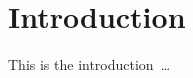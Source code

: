 \chapter{Introduction}
This is the introduction~\cite{deb01, pyprop, Dinvay2017}\ldots


%


%


















